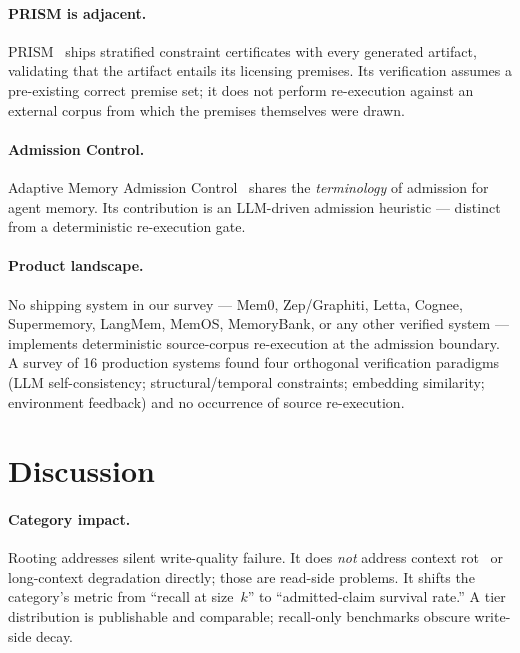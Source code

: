 \documentclass[10pt,a4paper]{article}
\begin{document}
\paragraph{PRISM is adjacent.}
PRISM~\cite{prism2025} ships stratified constraint certificates with every
generated artifact, validating that the artifact entails its licensing
premises. Its verification assumes a pre-existing correct premise set;
it does not perform re-execution against an external corpus from which
the premises themselves were drawn.

\paragraph{Admission Control.}
Adaptive Memory Admission Control~\cite{admissioncontrol2026} shares the
\emph{terminology} of admission for agent memory. Its contribution is an
LLM-driven admission heuristic --- distinct from a deterministic
re-execution gate.

\paragraph{Product landscape.}
No shipping system in our survey --- Mem0, Zep/Graphiti, Letta, Cognee,
Supermemory, LangMem, MemOS, MemoryBank, or any other verified system ---
implements deterministic source-corpus re-execution at the admission
boundary. A survey of 16 production systems found four orthogonal
verification paradigms (LLM self-consistency; structural/temporal
constraints; embedding similarity; environment feedback) and no occurrence
of source re-execution.

\section{Discussion}
\label{sec:discussion}

\paragraph{Category impact.}
Rooting addresses silent write-quality failure. It does \emph{not} address
context rot~\cite{chromarot2025} or long-context degradation directly;
those are read-side problems. It shifts the category's metric from
``recall at size~$k$'' to ``admitted-claim survival rate.'' A tier
distribution is publishable and comparable; recall-only benchmarks obscure
write-side decay.
\end{document}
